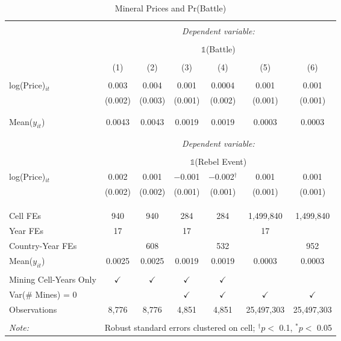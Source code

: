 \begin{table}[ht!] \centering 
  \caption{Mineral Prices and Pr(Battle)} 
  \label{tab:did_price_acled_battle} 
\begin{tabular}{@{\extracolsep{0pt}}lcccccc} 
\\[-1.8ex]\hline 
\hline \\[-1.8ex] 
 & \multicolumn{6}{c}{\textit{Dependent variable:}} \\ 
\cline{2-7} 
\\[-1.8ex] & \multicolumn{6}{c}{$\mathbb{1}$(Battle)} \\ 
\\[-1.8ex] & (1) & (2) & (3) & (4) & (5) & (6)\\ 
\hline \\[-1.8ex] 
 log(Price)$_{it}$ & 0.003 & 0.004 & 0.001 & 0.0004 & 0.001 & 0.001 \\ 
  & (0.002) & (0.003) & (0.001) & (0.002) & (0.001) & (0.001) \\ 
  & & & & & & \\ 
\hline \\[-1.8ex] 
Mean($y_{it}$) & 0.0043 & 0.0043 & 0.0019 & 0.0019 & 0.0003 & 0.0003 \\ 
\\[-1.8ex]\hline \hline \\[-1.8ex]
 & \multicolumn{6}{c}{\textit{Dependent variable:}} \\ 
\cline{2-7} 
\\[-1.8ex] & \multicolumn{6}{c}{$\mathbb{1}$(Rebel Event)} \\ 
 log(Price)$_{it}$ & 0.002 & 0.001 & $-$0.001 & $-$0.002$^{\dagger}$ & 0.001 & 0.001 \\ 
  & (0.002) & (0.002) & (0.001) & (0.001) & (0.001) & (0.001) \\ 
  & & & & & & \\ 
\hline \\[-1.8ex] 
\hline \\[-1.8ex] Cell FEs & 940 & 940 & 284 & 284 & 1,499,840 & 1,499,840 \\ 
Year FEs & 17 &  & 17 &  & 17 &  \\ 
Country-Year FEs &  & 608 &  & 532 &  & 952 \\ 
Mean($y_{it}$) & 0.0025 & 0.0025 & 0.0019 & 0.0019 & 0.0003 & 0.0003 \\ 
\hline \\[-1.8ex] Mining Cell-Years Only & $\checkmark$ & $\checkmark$ & $\checkmark$ & $\checkmark$ &  &  \\ 
Var(\# Mines) = 0 &  &  & $\checkmark$ & $\checkmark$ & $\checkmark$ & $\checkmark$ \\ 
Observations & 8,776 & 8,776 & 4,851 & 4,851 & 25,497,303 & 25,497,303 \\ 
\hline 
\hline \\[-1.8ex] 
\textit{Note:}  & \multicolumn{6}{r}{Robust standard errors clustered on cell; $^{\dagger} p <$ 0.1, $^*p <$ 0.05} \\ 
\end{tabular} 
\end{table} 
